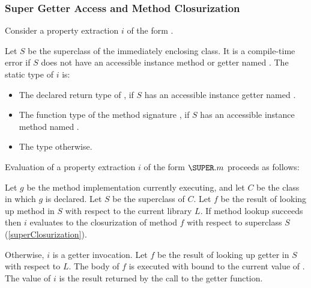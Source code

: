 \documentclass[makeidx]{article}
\begin{document}
{\subsubsection{Super Getter Access and Method Closurization}

\LMHash{}%
Consider a property extraction $i$ of the form .

\LMHash{}%
Let $S$ be the superclass of the immediately enclosing class.
It is a compile-time error if $S$ does not have
an accessible instance method or getter named \id.
The static type of $i$ is:

\begin{itemize}
\item The declared return type of ,
  if $S$ has an accessible instance getter named \id.
\item The function type of the method signature ,
  if $S$ has an accessible instance method named \id.
\item The type \DYNAMIC{} otherwise.
\end{itemize}


\LMHash{}%
Evaluation of a property extraction $i$ of the form $\SUPER.m$ proceeds as follows:

\LMHash{}%
Let $g$ be the method implementation currently executing,
and let $C$ be the class in which $g$ is declared.
Let $S$ be the superclass of $C$.
Let $f$ be the result of looking up method \id{} in $S$
with respect to the current library $L$.
If method lookup succeeds then $i$ evaluates to
the closurization of method $f$
with respect to superclass $S$
(\ref{superClosurization}).

\LMHash{}%
Otherwise, $i$ is a getter invocation.
Let $f$ be the result of looking up
getter \id{} in $S$ with respect to $L$.
The body of $f$ is executed with \THIS{} bound to the current value of \THIS{}.
The value of $i$ is the result returned by the call to the getter function.



}
\end{document}
